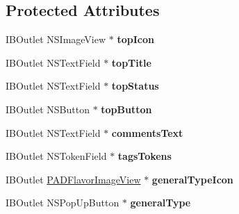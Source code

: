 \subsection*{Protected Attributes}
\begin{DoxyCompactItemize}
\item 
\hypertarget{interface_p_a_d_inspector_controller_a3608b30e7bc8dc1866fd8ba8debd9b21}{
IBOutlet NSImageView $\ast$ {\bfseries topIcon}}
\label{interface_p_a_d_inspector_controller_a3608b30e7bc8dc1866fd8ba8debd9b21}

\item 
\hypertarget{interface_p_a_d_inspector_controller_a145771b6413b2f94869f36a0ea8741c3}{
IBOutlet NSTextField $\ast$ {\bfseries topTitle}}
\label{interface_p_a_d_inspector_controller_a145771b6413b2f94869f36a0ea8741c3}

\item 
\hypertarget{interface_p_a_d_inspector_controller_a61b71c52a47acd10fbc9b9b57fff3bbe}{
IBOutlet NSTextField $\ast$ {\bfseries topStatus}}
\label{interface_p_a_d_inspector_controller_a61b71c52a47acd10fbc9b9b57fff3bbe}

\item 
\hypertarget{interface_p_a_d_inspector_controller_aa4885244d5a590c5b1e8cc8b6baf28a5}{
IBOutlet NSButton $\ast$ {\bfseries topButton}}
\label{interface_p_a_d_inspector_controller_aa4885244d5a590c5b1e8cc8b6baf28a5}

\item 
\hypertarget{interface_p_a_d_inspector_controller_aafc01fd3b705a190e00a83d7677bd78a}{
IBOutlet NSTextField $\ast$ {\bfseries commentsText}}
\label{interface_p_a_d_inspector_controller_aafc01fd3b705a190e00a83d7677bd78a}

\item 
\hypertarget{interface_p_a_d_inspector_controller_a8888f1a836f37dddd65a21c810aa69ba}{
IBOutlet NSTokenField $\ast$ {\bfseries tagsTokens}}
\label{interface_p_a_d_inspector_controller_a8888f1a836f37dddd65a21c810aa69ba}

\item 
\hypertarget{interface_p_a_d_inspector_controller_a53976d513ef8b27dbcc4133af988ada4}{
IBOutlet \hyperlink{interface_p_a_d_flavor_image_view}{PADFlavorImageView} $\ast$ {\bfseries generalTypeIcon}}
\label{interface_p_a_d_inspector_controller_a53976d513ef8b27dbcc4133af988ada4}

\item 
\hypertarget{interface_p_a_d_inspector_controller_ae5adf2aaf4c5dc9a789180feb2119ced}{
IBOutlet NSPopUpButton $\ast$ {\bfseries generalType}}
\label{interface_p_a_d_inspector_controller_ae5adf2aaf4c5dc9a789180feb2119ced}


\end{DoxyCompactItemize}
